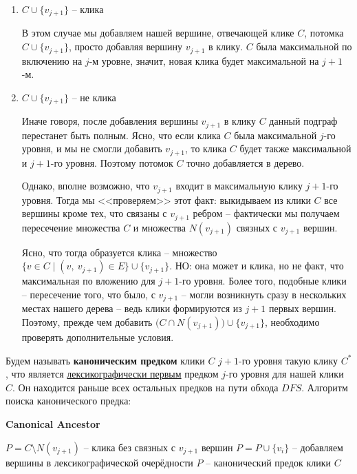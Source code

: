\documentclass[a4paper,12pt]{article}
\begin{document}
\begin{enumerate}
    \item $C \cup \{v_{j + 1}\}$ -- клика
    
    В этом случае мы добавляем нашей вершине, отвечающей клике $C$, потомка $C \cup \{v_{j + 1}\}$, просто добавляя вершину $v_{j + 1}$ в клику. $C$ была максимальной по включению на $j$-м уровне, значит, новая клика будет максимальной на $j + 1$-м.
    
    \item $C \cup \{v_{j + 1}\}$ -- не клика
    
    Иначе говоря, после добавления вершины $v_{j + 1}$ в клику $C$ данный подграф перестанет быть полным. Ясно, что если клика $C$ была максимальной $j$-го уровня, и мы не смогли добавить $v_{j + 1}$, то клика $C$ будет также максимальной и $j + 1$-го уровня. Поэтому потомок $C$ точно добавляется в дерево.
    
    Однако, вполне возможно, что $v_{j+1}$ входит в максимальную клику $j + 1$-го уровня. Тогда мы <<проверяем>> этот факт: выкидываем из клики $C$ все вершины кроме тех, что связаны с $v_{j + 1}$ ребром -- фактически мы получаем пересечение множества $C$ и множества $N(v_{j + 1})$ связных с $v_{j + 1}$ вершин. 
    
    Ясно, что тогда образуется клика -- множество $\{v \in C\mid (v,\ v_{j + 1}) \in E\} \cup \{v_{j + 1}\}$. НО: она может и клика, но не факт, что максимальная по вложению для $j + 1$-го уровня. Более того, подобные клики -- пересечение того, что было, с $v_{j + 1}$ -- могли возникнуть сразу в нескольких местах нашего дерева -- ведь клики формируются из $j + 1$ первых вершин. Поэтому, прежде чем добавить $\big(C \cap N(v_{j + 1})\big)\cup\{v_{j + 1}\}$, необходимо проверять дополнительные условия.
\end{enumerate}

Будем называть \textbf{каноническим предком} клики $C$ $j + 1$-го уровня такую клику $C^*$, что является \underline{лексикографически первым} предком $j$-го уровня для нашей клики $C$. Он находится раньше всех остальных предков на пути обхода $DFS$. Алгоритм поиска канонического предка:

\begin{algorithm}[H]
    \caption{\textbf{Canonical Ancestor}}
    \begin{algorithmic}
        \Statex
        \State $P = C \setminus N(v_{j + 1})$ -- клика без связных с $v_{j + 1}$ вершин
                \State $P = P \cup \{v_i\}$ -- добавляем вершины в лексикографической очерёдности
            \EndIf    
        \EndFor
        \State\Return $P$ -- канонический предок клики $C$
    \end{algorithmic}
\end{algorithm}
\end{document}
